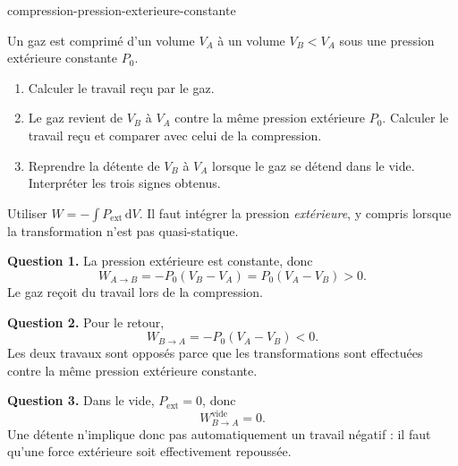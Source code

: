 \begin{exo}{compression-pression-exterieure-constante}

Un gaz est comprimé d'un volume $V_A$ à un volume $V_B<V_A$ sous une
pression extérieure constante $P_0$.

\begin{enumerate}
\item Calculer le travail reçu par le gaz.
\item Le gaz revient de $V_B$ à $V_A$ contre la même pression extérieure
$P_0$. Calculer le travail reçu et comparer avec celui de la compression.
\item Reprendre la détente de $V_B$ à $V_A$ lorsque le gaz se détend dans le
vide. Interpréter les trois signes obtenus.
\end{enumerate}

\begin{indication}
Utiliser $W=-\int P_{\mathrm{ext}}\,\mathrm{d}V$. Il faut intégrer la pression
\emph{extérieure}, y compris lorsque la transformation n'est pas
quasi-statique.
\end{indication}

\begin{solution}
\textbf{Question 1.} La pression extérieure est constante, donc
\[
W_{A\to B}=-P_0(V_B-V_A)=P_0(V_A-V_B)>0.
\]
Le gaz reçoit du travail lors de la compression.

\textbf{Question 2.} Pour le retour,
\[
W_{B\to A}=-P_0(V_A-V_B)<0.
\]
Les deux travaux sont opposés parce que les transformations sont effectuées
contre la même pression extérieure constante.

\textbf{Question 3.} Dans le vide, $P_{\mathrm{ext}}=0$, donc
\[
W_{B\to A}^{\mathrm{vide}}=0.
\]
Une détente n'implique donc pas automatiquement un travail négatif : il faut
qu'une force extérieure soit effectivement repoussée.
\end{solution}
\end{exo}
